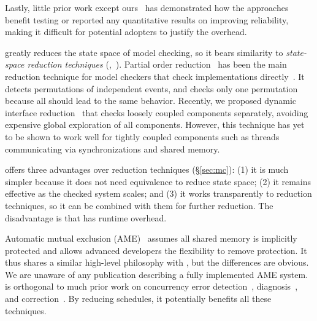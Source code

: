Lastly, little prior work except ours~\cite{wu:pldi12} has demonstrated how the
approaches benefit testing or reported any quantitative results on
improving reliability, making it difficult for potential adopters to
justify the overhead.

 \parrot greatly reduces the state space of
model checking, so it bears similarity to \emph{state-space reduction
  techniques} (\eg,~\cite{godefroid:verisoft, flanagan:dynamicpo,
  demeter:sosp11}).  Partial order
reduction~\cite{godefroid:verisoft, flanagan:dynamicpo} has been the main
reduction technique for model checkers that check implementations
directly~\cite{modist:nsdi09, dbug:spin11}.  It detects
permutations of independent events, and checks only one permutation
because all should lead to the same behavior.  Recently, we proposed
dynamic interface reduction~\cite{demeter:sosp11} that checks loosely
coupled components separately, avoiding expensive global exploration of
all components.  However, this technique has yet to be shown to work well
for tightly coupled components such as threads communicating
via synchronizations and shared memory.

\parrot offers three advantages over reduction techniques
(\S\ref{sec:mc}): (1) it is much simpler because it does not
need equivalence to reduce state space; (2) it remains effective as the
checked system scales; and (3) it works transparently to reduction
techniques, so it can be combined with them for further reduction.  The
disadvantage is that \parrot has runtime overhead.

 Automatic mutual exclusion (AME)~\cite{ame:hotos07} 
assumes all shared
memory is implicitly protected and allows advanced developers the
flexibility to remove protection.  It thus shares a similar high-level
philosophy with \parrot, but the differences are obvious.  We are unaware of
any publication describing a fully implemented AME system. \parrot is
orthogonal to much prior work on concurrency error
detection~\cite{yu:racetrack:sosp,savage:eraser,racerx:sosp03,lu:muvi:sosp,
avio:asplos06,conmem:asplos10},
diagnosis~\cite{racefuzzer:pldi08,ctrigger:asplos09,atomfuzzer:fse08}, and
correction~\cite{dimmunix:osdi08,gadara:osdi08,wu:loom:osdi10,cfix:osdi12}. By
reducing schedules, it potentially benefits all these techniques.



